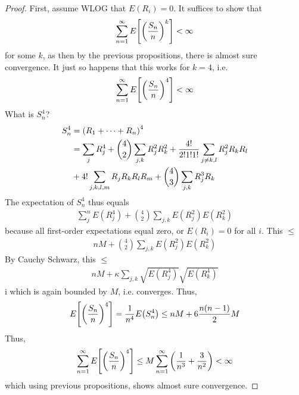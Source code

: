 \begin{proof}
    First, assume WLOG that $E(R_i) = 0$. It suffices to show that
    \begin{align}
        \sum_{n=1}^\infty E\qty[\qty(\frac{S_n}{n})^k] < \infty
    \end{align}
    for some $k$, as then by the previous propositions, there is almost sure convergence. It just so happens that this works for $k = 4$, i.e.
    \begin{align}
        \sum_{n=1}^\infty E\qty[\qty(\frac{S_n}{n})^4] < \infty
    \end{align}
    What is $S_n^4$?
    \begin{align}
        S_n^4 &= \qty(R_1 + \cdots + R_n)^4\\
        &= \sum_{j} R_j^4 + \binom{4}{2} \sum_{j,k} R_j^2 R_k^2 + \frac{4!}{2!1!1!} \sum_{j \ne k,l} R_j^2 R_k R_l\\
        &+ 4! \sum_{j,k,l,m} R_jR_kR_lR_m + \binom{4}{3} \sum_{j,k} R_j^3 R_k
    \end{align}
    The expectation of $S_n^4$ thus equals
    \begin{align}
        \sum_{j}^n E(R_j^4) + \binom{4}{2} \sum_{j,k} E(R_j^2) E(R_k^2)
    \end{align}
    because all first-order expectations equal zero, or $E(R_i) = 0$ for all $i$. This $\le$
    \begin{align}
        nM + \binom{4}{2} \sum_{j,k} E(R_j^2) E(R_k^2)
    \end{align}
    By Cauchy Schwarz, this $\le$
    \begin{align}
        nM + \kappa \sum_{j,k} \sqrt{E(R_j^4)} \sqrt{E(R_k^4)}
    \end{align}i
    which is again bounded by $M$, i.e. converges. Thus,
    \begin{align}
        E\qty[\qty(\frac{S_n}{n})^4] = \frac{1}{n^4} E\qty(S_n^4) \le nM + 6\frac{n(n-1)}{2}M
    \end{align}
    Thus,
    \begin{align}
        \sum_{n=1}^\infty E\qty[\qty(\frac{S_n}{n})^4] \le M \sum_{n=1}^\infty \qty(\frac{1}{n^3} + \frac{3}{n^2}) < \infty
    \end{align}
    which using previous propositions, shows almost sure convergence.
\end{proof}

